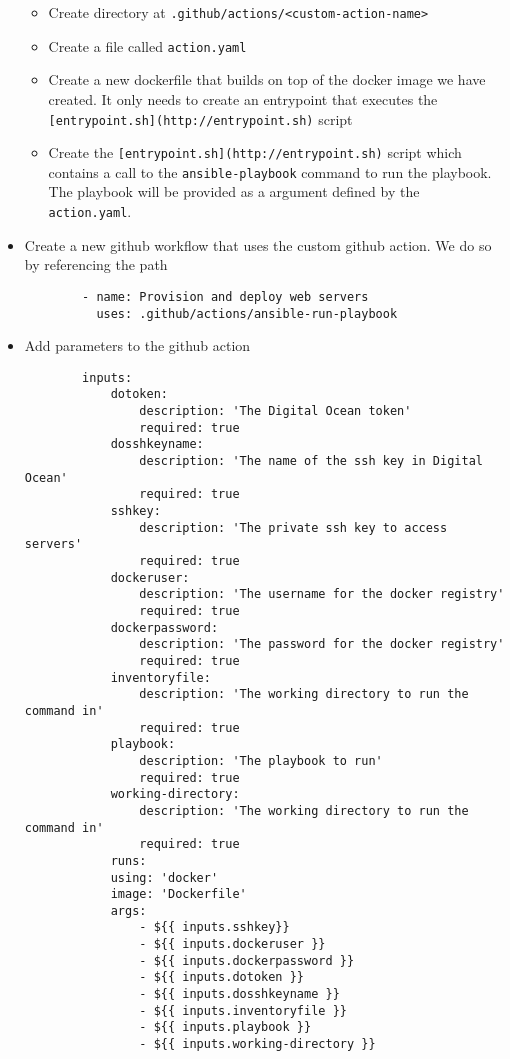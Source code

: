 \begin{itemize}
    \begin{itemize}
        \item Create directory at \texttt{.github/actions/\textless{}custom-action-name\textgreater{}}
        \item Create a file called \texttt{action.yaml}
        \item Create a new dockerfile that builds on top of the docker image we have created. It only needs to create an entrypoint that executes the \texttt{{[}entrypoint.sh{]}(http://entrypoint.sh)} script
        \item Create the \texttt{{[}entrypoint.sh{]}(http://entrypoint.sh)} script which contains a call to the \texttt{ansible-playbook} command to run the playbook. The playbook will be provided as a argument defined by the \texttt{action.yaml}.
    \end{itemize}
    \item Create a new github workflow that uses the custom github action. We do so by referencing the path

    \begin{verbatim}
        - name: Provision and deploy web servers
          uses: .github/actions/ansible-run-playbook
    \end{verbatim}
    \item Add parameters to the github action

    \begin{verbatim}
        inputs:
            dotoken:
                description: 'The Digital Ocean token'
                required: true
            dosshkeyname:
                description: 'The name of the ssh key in Digital Ocean'
                required: true
            sshkey:
                description: 'The private ssh key to access servers'
                required: true
            dockeruser:
                description: 'The username for the docker registry'
                required: true
            dockerpassword:
                description: 'The password for the docker registry'
                required: true
            inventoryfile:
                description: 'The working directory to run the command in'
                required: true
            playbook:
                description: 'The playbook to run'
                required: true
            working-directory:
                description: 'The working directory to run the command in'
                required: true
            runs:
            using: 'docker'
            image: 'Dockerfile'
            args:
                - ${{ inputs.sshkey}}
                - ${{ inputs.dockeruser }}
                - ${{ inputs.dockerpassword }}
                - ${{ inputs.dotoken }}
                - ${{ inputs.dosshkeyname }}
                - ${{ inputs.inventoryfile }}
                - ${{ inputs.playbook }}
                - ${{ inputs.working-directory }}
    \end{verbatim}


\end{itemize}
